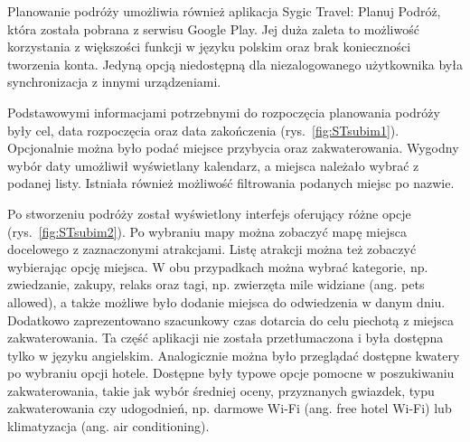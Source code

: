 \documentclass[10pt,twoside,a4paper]{report}
\begin{document}
\par Planowanie podróży umożliwia również aplikacja Sygic Travel: Planuj Podróż, która została pobrana z serwisu Google Play. Jej duża zaleta to możliwość korzystania z większości funkcji w języku polskim oraz brak konieczności tworzenia konta. Jedyną opcją niedostępną dla niezalogowanego użytkownika była synchronizacja z innymi urządzeniami.
\par Podstawowymi informacjami potrzebnymi do rozpoczęcia planowania podróży były cel, data rozpoczęcia oraz data zakończenia (rys.~\ref{fig:STsubim1}). Opcjonalnie można było podać miejsce przybycia oraz zakwaterowania. Wygodny wybór daty umożliwił wyświetlany kalendarz, a miejsca należało wybrać z podanej listy. Istniała również możliwość filtrowania podanych miejsc po nazwie.
\par Po stworzeniu podróży został wyświetlony interfejs oferujący różne opcje (rys.~\ref{fig:STsubim2}). Po wybraniu mapy można zobaczyć mapę miejsca docelowego z zaznaczonymi atrakcjami. Listę atrakcji można też zobaczyć wybierając opcję miejsca. W obu przypadkach można wybrać kategorie, np. zwiedzanie, zakupy, relaks oraz tagi, np. zwierzęta mile widziane (ang. pets allowed), a także możliwe było dodanie miejsca do odwiedzenia w danym dniu. Dodatkowo zaprezentowano szacunkowy czas dotarcia do celu piechotą z miejsca zakwaterowania. Ta część aplikacji nie została przetłumaczona i była dostępna tylko w języku angielskim. Analogicznie można było przeglądać dostępne kwatery po wybraniu opcji hotele. Dostępne były typowe opcje pomocne w poszukiwaniu zakwaterowania, takie jak wybór średniej oceny, przyznanych gwiazdek, typu zakwaterowania czy udogodnień, np. darmowe Wi-Fi (ang. free hotel Wi-Fi) lub klimatyzacja (ang. air conditioning).
\end{document}

